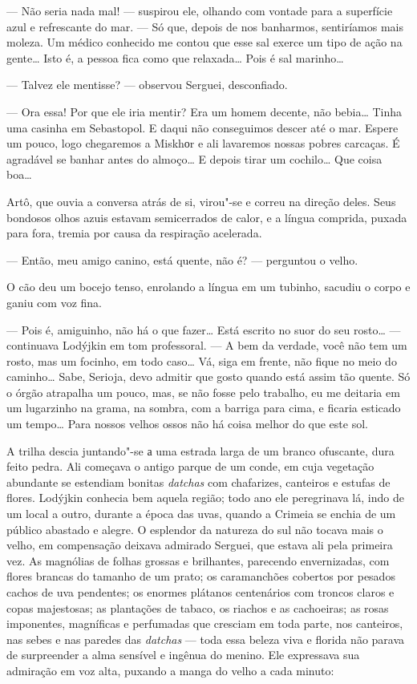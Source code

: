 --- Não seria nada mal! --- suspirou ele, olhando com vontade para a
superfície azul e refrescante do mar. --- Só que, depois de nos
banharmos, sentiríamos mais moleza. Um médico conhecido me contou que
esse sal exerce um tipo de ação na gente\ldots{} Isto é, a pessoa fica como
que relaxada\ldots{} Pois é sal marinho\ldots{}

--- Talvez ele mentisse? --- observou Serguei, desconfiado.

--- Ora essa! Por que ele iria mentir? Era um homem decente, não
bebia\ldots{} Tinha uma casinha em Sebastopol. E daqui não conseguimos descer
até o mar. Espere um pouco, logo chegaremos a Miskhоr e ali lavaremos
nossas pobres carcaças. É agradável se banhar antes do almoço\ldots{} E
depois tirar um cochilo\ldots{} Que coisa boa\ldots{}

Artô, que ouvia a conversa atrás de si, virou"-se e correu na direção
deles. Seus bondosos olhos azuis estavam semicerrados de calor, e a
língua comprida, puxada para fora, tremia por causa da respiração
acelerada.

--- Então, meu amigo canino, está quente, não é? --- perguntou o velho.

O cão deu um bocejo tenso, enrolando a língua em um tubinho, sacudiu o
corpo e ganiu com voz fina.

--- Pois é, amiguinho, não há o que fazer\ldots{} Está escrito no suor do seu
rosto\ldots{} --- continuava Lodýjkin em tom professoral. --- A bem da
verdade, você não tem um rosto, mas um focinho, em todo caso\ldots{} Vá, siga
em frente, não fique no meio do caminho\ldots{} Sabe, Serioja, devo admitir
que gosto quando está assim tão quente. Só o órgão atrapalha um pouco,
mas, se não fosse pelo trabalho, eu me deitaria em um lugarzinho na
grama, na sombra, com a barriga para cima, e ficaria esticado um
tempo\ldots{} Para nossos velhos ossos não há coisa melhor do que este sol.

A trilha descia juntando"-se а uma estrada larga de um branco ofuscante,
dura feito pedra. Ali começava o antigo parque de um conde, em cuja
vegetação abundante se estendiam bonitas \emph{datchas} com chafarizes,
canteiros e estufas de flores. Lodýjkin conhecia bem aquela região; todo
ano ele peregrinava lá, indo de um local a outro, durante a época das
uvas, quando a Crimeia se enchia de um público abastado e alegre. O
esplendor da natureza do sul não tocava mais o velho, em compensação
deixava admirado Serguei, que estava ali pela primeira vez. As magnólias
de folhas grossas e brilhantes, parecendo envernizadas, com flores
brancas do tamanho de um prato; os caramanchões cobertos por pesados
cachos de uva pendentes; os enormes plátanos centenários com troncos
claros e copas majestosas; as plantações de tabaco, os riachos e as
cachoeiras; as rosas imponentes, magníficas e perfumadas que cresciam em
toda parte, nos canteiros, nas sebes e nas paredes das \emph{datchas}
--- toda essa beleza viva e florida não parava de surpreender a alma
sensível e ingênua do menino. Ele expressava sua admiração em voz alta,
puxando a manga do velho a cada minuto:

